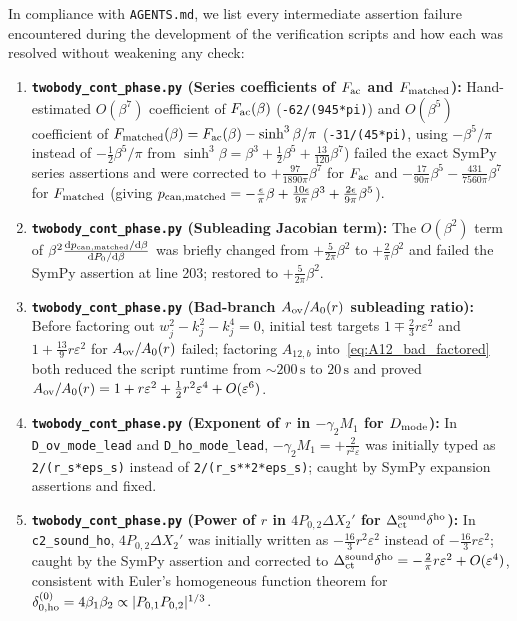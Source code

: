 \documentclass[11pt,a4paper]{article}
\newcommand{\script}[1]{\texttt{#1}}
\newcommand{\dd}{\mathrm{d}}
\begin{document}
In compliance with \texttt{AGENTS.md}, we list every intermediate assertion failure encountered during the development of the verification scripts and how each was resolved without weakening any check:
\begin{enumerate}
\item \textbf{\script{twobody\_cont\_phase.py} (Series coefficients of $F_{\rm ac}$ and $F_{\rm matched}$):} Hand-estimated $O(\beta^7)$ coefficient of $F_{\rm ac}(\beta)$ (\texttt{-62/(945*pi)}) and $O(\beta^5)$ coefficient of $F_{\rm matched}(\beta)=F_{\rm ac}(\beta)-\sinh^3\beta/\pi$ (\texttt{-31/(45*pi)}, using $-\beta^5/\pi$ instead of $-\frac12\beta^5/\pi$ from $\sinh^3\beta=\beta^3+\frac12\beta^5+\frac{13}{120}\beta^7$) failed the exact SymPy series assertions and were corrected to $+\frac{97}{1890\pi}\beta^7$ for $F_{\rm ac}$ and $-\frac{17}{90\pi}\beta^5-\frac{431}{7560\pi}\beta^7$ for $F_{\rm matched}$ (giving $p_{\rm can,matched}=-\frac{\epsilon}{\pi}\beta+\frac{10\epsilon}{9\pi}\beta^3+\frac{2\epsilon}{9\pi}\beta^5$).
\item \textbf{\script{twobody\_cont\_phase.py} (Subleading Jacobian term):} The $O(\beta^2)$ term of $\beta^2\frac{\dd p_{\rm can,matched}/\dd\beta}{\dd P_0/\dd\beta}$ was briefly changed from $+\frac{5}{2\pi}\beta^2$ to $+\frac{2}{\pi}\beta^2$ and failed the SymPy assertion at line 203; restored to $+\frac{5}{2\pi}\beta^2$.
\item \textbf{\script{twobody\_cont\_phase.py} (Bad-branch $A_{\rm ov}/A_0(r)$ subleading ratio):} Before factoring out $w_j^2-k_j^2-k_j^4=0$, initial test targets $1\mp\frac23 r\varepsilon^2$ and $1+\frac{13}{9}r\varepsilon^2$ for $A_{\rm ov}/A_0(r)$ failed; factoring $A_{12,b}$ into~\eqref{eq:A12_bad_factored} both reduced the script runtime from $\sim 200\,\mathrm{s}$ to $20\,\mathrm{s}$ and proved $A_{\rm ov}/A_0(r)=1+r\varepsilon^2+\frac12 r^2\varepsilon^4+O(\varepsilon^6)$.
\item \textbf{\script{twobody\_cont\_phase.py} (Exponent of $r$ in $-\gamma_2 M_1$ for $D_{\rm mode}$):} In \texttt{D\_ov\_mode\_lead} and \texttt{D\_ho\_mode\_lead}, $-\gamma_2 M_1=+\frac{2}{r^2\varepsilon}$ was initially typed as \texttt{2/(r\_s*eps\_s)} instead of \texttt{2/(r\_s**2*eps\_s)}; caught by SymPy expansion assertions and fixed.
\item \textbf{\script{twobody\_cont\_phase.py} (Power of $r$ in $4P_{0,2}\Delta X_2'$ for $\Delta_{\rm ct}^{\rm sound}\delta^{\rm ho}$):} In \texttt{c2\_sound\_ho}, $4P_{0,2}\Delta X_2'$ was initially written as $-\frac{16}{3}r^2\varepsilon^2$ instead of $-\frac{16}{3}r\varepsilon^2$; caught by the SymPy assertion and corrected to $\Delta_{\rm ct}^{\rm sound}\delta^{\rm ho}=-\frac{2}{\pi}r\varepsilon^2+O(\varepsilon^4)$, consistent with Euler's homogeneous function theorem for $\delta_{0,\rm ho}^{(0)}=4\beta_1\beta_2\propto |P_{0,1}P_{0,2}|^{1/3}$.

\end{enumerate}
\end{document}
